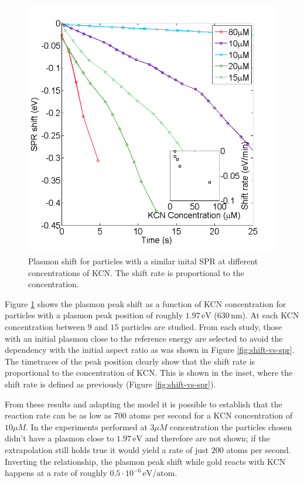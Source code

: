 \documentclass{article}
\begin{document}
\begin{figure}[p]
 \centering
 \includegraphics[width=0.95\linewidth]{shift_different_concentrations.png}
 \caption{Plasmon shift for particles with a similar inital SPR at different
 concentrations of KCN. The shift rate is proportional to the concentration.}
 \label{fig:shift_concentration}
\end{figure}

Figure \ref{fig:shift_concentration} shows the plasmon peak shift as a function
of KCN concentration for particles with a plasmon peak position of roughly
$1.97\,\textrm{eV}$ ($630\,\textrm{nm}$). At each KCN concentration between $9$
and $15$ particles are studied. From each study, those with an initial plasmon
close to the reference energy are selected to avoid the dependency with the
initial aspect ratio as was shown in Figure \ref{fig:shift-vs-spr}. The
timetraces of the peak position clearly show that the shift rate is proportional
to the concentration of KCN. This is shown in the inset, where the shift rate is
defined as previously (Figure \ref{fig:shift-vs-spr}). 

From these results and adapting the model it is possible to establish that the
reaction rate can be as low as $700$ atoms per second for a KCN concentration of
$10\mu M$. In the experiments performed at $3\mu M$ concentration the particles
chosen didn't have a plasmon close to $1.97\,\textrm{eV}$ and therefore are not
shown; if the extrapolation still holds true it would yield a rate of just $200$
atoms per second. Inverting the relationship, the plasmon peak shift while gold
reacts with KCN happens at a rate of roughly $0.5\cdot
10^{-6}\,\textrm{eV}/\textrm{atom}$.
\end{document}
